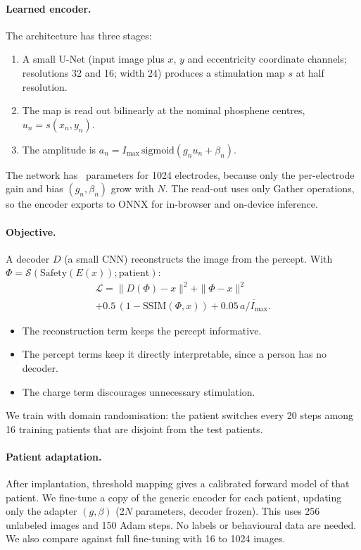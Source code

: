 \paragraph{Learned encoder.} The architecture has three stages:
\begin{enumerate}
\item A small U-Net (input image plus $x$, $y$ and eccentricity coordinate channels; resolutions 32 and 16; width 24) produces a stimulation map $s$ at half resolution.
\item The map is read out bilinearly at the nominal phosphene centres, $u_n=s(x_n,y_n)$.
\item The amplitude is $a_n=I_{\max}\,\mathrm{sigmoid}(g_n u_n+\beta_n)$.
\end{enumerate}
The network has \NumEncParams\ parameters for 1024 electrodes, because only the per-electrode gain and bias $(g_n,\beta_n)$ grow with $N$. The read-out uses only Gather operations, so the encoder exports to ONNX for in-browser and on-device inference.

\paragraph{Objective.} A decoder $D$ (a small CNN) reconstructs the image from the percept. With $\Phi=\mathcal S(\mathrm{Safety}(E(x));\text{patient})$:
\begin{multline}
\mathcal L = \|D(\Phi)-x\|^2 + \|\Phi-x\|^2 \\ + 0.5\,(1-\mathrm{SSIM}(\Phi,x)) + 0.05\,\overline{a/I_{\max}}.
\end{multline}
\begin{itemize}
\item The reconstruction term \citep{deruyter2022end} keeps the percept informative.
\item The percept terms keep it directly interpretable, since a person has no decoder.
\item The charge term discourages unnecessary stimulation.
\end{itemize}
We train with domain randomisation: the patient switches every 20 steps among 16 training patients that are disjoint from the test patients.

\paragraph{Patient adaptation.} After implantation, threshold mapping gives a calibrated forward model of that patient. We fine-tune a copy of the generic encoder for each patient, updating only the adapter $(g,\beta)$ (2$N$ parameters, decoder frozen). This uses 256 unlabeled images and 150 Adam steps. No labels or behavioural data are needed. We also compare against full fine-tuning with 16 to 1024 images.

